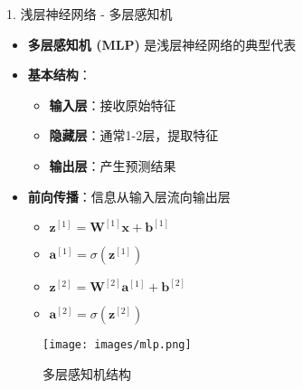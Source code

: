 \documentclass[
  ignorenonframetext,
  aspectratio=169,
  chinese-hans,
]{beamer}
\providecommand{\tightlist}{%
  \setlength{\itemsep}{0pt}\setlength{\parskip}{0pt}}\usepackage{longtable,booktabs,array}
\begin{document}
\begin{frame}{1. 浅层神经网络 - 多层感知机}
\label{ux6d45ux5c42ux795eux7ecfux7f51ux7edc---ux591aux5c42ux611fux77e5ux673a}
\begin{itemize}
\item
  \textbf{多层感知机 (MLP)} 是浅层神经网络的典型代表
\item
  \textbf{基本结构}：

  \begin{itemize}
  \tightlist
  \item
    \textbf{输入层}：接收原始特征
  \item
    \textbf{隐藏层}：通常1-2层，提取特征
  \item
    \textbf{输出层}：产生预测结果
  \end{itemize}
\item
  \textbf{前向传播}：信息从输入层流向输出层

  \begin{itemize}
  \tightlist
  \item
    \(\mathbf{z}^{[1]} = \mathbf{W}^{[1]} \mathbf{x} + \mathbf{b}^{[1]}\)
  \item
    \(\mathbf{a}^{[1]} = \sigma(\mathbf{z}^{[1]})\)
  \item
    \(\mathbf{z}^{[2]} = \mathbf{W}^{[2]} \mathbf{a}^{[1]} + \mathbf{b}^{[2]}\)
  \item
    \(\mathbf{a}^{[2]} = \sigma(\mathbf{z}^{[2]})\)
  \end{itemize}
\end{itemize}

\begin{figure}[H]

{\centering \texttt{[image: images/mlp.png]}

}

\caption{多层感知机结构}

\end{figure}%
\end{frame}
\end{document}
